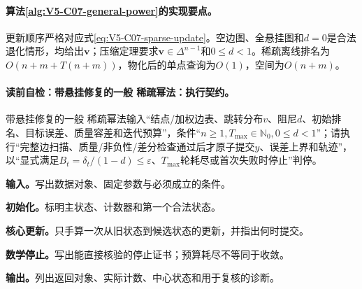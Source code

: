 \paragraph{算法\ref{alg:V5-C07-general-power}的实现要点。}
更新顺序严格对应式\eqref{eq:V5-C07-sparse-update}。空边图、全悬挂图和$d=0$是合法退化情形，均给出$\boldsymbol v$；压缩定理要求$\boldsymbol v\in\Delta^{n-1}$和$0\le d<1$。稀疏离线排名为$O(n+m+T(n+m))$，物化后的单点查询为$O(1)$，空间为$O(n+m)$。

\begingroup\SetAlgoLined
\paragraph{读前自检：带悬挂修复的一般 稀疏幂法：执行契约。}带悬挂修复的一般 稀疏幂法输入“结点/加权边表、跳转分布$v$、阻尼$d$、初始排名、目标误差、质量容差和迭代预算”，条件“$n\ge1,T_{\max}\in\mathbb N_0,0\le d<1$”；请执行“完整边扫描、质量/非负性/差分检查通过后才原子提交$y$、误差上界和轨迹”，以“显式满足$B_t=\delta_t/(1-d)\le\varepsilon$、$T_{\max}$轮耗尽或首次失败时停止”判停。\par
\begin{keypointbox}[title={带悬挂修复的一般 稀疏幂法：五步阅读}]
\textbf{输入。}写出数据对象、固定参数与必须成立的条件。\par
\textbf{初始化。}标明主状态、计数器和第一个合法状态。\par
\textbf{核心更新。}只手算一次从旧状态到候选状态的更新，并指出何时提交。\par
\textbf{数学停止。}写出能直接核验的停止证书；预算耗尽不等同于收敛。\par
\textbf{输出。}列出返回对象、实际计数、中心状态和用于复核的诊断。
\end{keypointbox}

